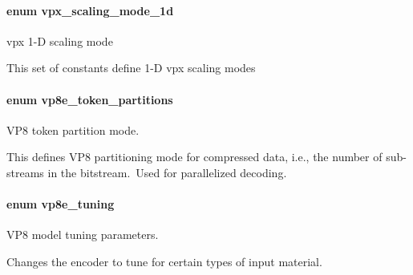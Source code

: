 \hypertarget{group__vp8__encoder_ga70071b1bb6cac9a1ef0ea3d8362ff94f}{
\paragraph[{vpx\+\_\+scaling\+\_\+mode\+\_\+1d}]{\setlength{\rightskip}{0pt plus 5cm}enum {\bf vpx\+\_\+scaling\+\_\+mode\+\_\+1d}}}\label{group__vp8__encoder_ga70071b1bb6cac9a1ef0ea3d8362ff94f}


vpx 1-\/\+D scaling mode 

This set of constants define 1-\/\+D vpx scaling modes \hypertarget{group__vp8__encoder_ga5f7508ba3fb453b47f62313ed0b864d2}{
\paragraph[{vp8e\+\_\+token\+\_\+partitions}]{\setlength{\rightskip}{0pt plus 5cm}enum {\bf vp8e\+\_\+token\+\_\+partitions}}}\label{group__vp8__encoder_ga5f7508ba3fb453b47f62313ed0b864d2}


V\+P8 token partition mode. 

This defines V\+P8 partitioning mode for compressed data, i.\+e., the number of sub-\/streams in the bitstream.\+ \+Used for parallelized decoding. \hypertarget{group__vp8__encoder_ga371dbc29054b3d46364af996ad42ab94}{
\paragraph[{vp8e\+\_\+tuning}]{\setlength{\rightskip}{0pt plus 5cm}enum {\bf vp8e\+\_\+tuning}}}\label{group__vp8__encoder_ga371dbc29054b3d46364af996ad42ab94}


V\+P8 model tuning parameters. 

Changes the encoder to tune for certain types of input material. 